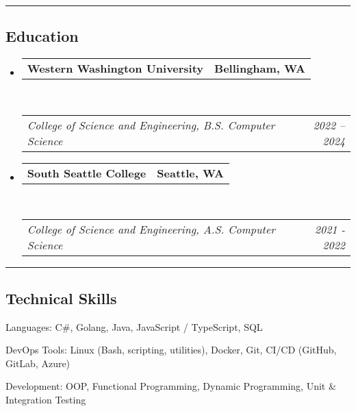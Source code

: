 \documentclass[10pt,letterpaper]{article}
\makeatletter
\newenvironment{indentsection}[1]%
{\begin{list}{}%
	{\setlength{\leftmargin}{#1}}%
	\item[]%
}
{\end{list}}
\newcommand{\headerrow}[2]
{\begin{tabular*}{\linewidth}{l@{\extracolsep{\fill}}r}
	#1 &
	#2 \\
\end{tabular*}}
\makeatother
\begin{document}
\hrule
\subsection*{Education}

\begin{itemize}
  \item
        \headerrow
        {\textbf{Western Washington University}}
        {\textbf{Bellingham, WA}}
        \\
        \headerrow
        {\emph{College of Science and Engineering, B.S. Computer Science}}
        {\emph{2022 -- 2024}}
  \item
        \headerrow
        {\textbf{South Seattle College}}
        {\textbf{Seattle, WA}}
        \\
        \headerrow
        {\emph{College of Science and Engineering, A.S. Computer Science}}
        {\emph{2021 - 2022}}
\end{itemize}

\hrule
\subsection*{Technical Skills}

\begin{indentsection}{\parindent}
  \begin{description*}
    \item[Languages:] C\#, Golang, Java, JavaScript / TypeScript, SQL
    \item[DevOps Tools:] Linux (Bash, scripting, utilities), Docker, Git, CI/CD (GitHub, GitLab, Azure)
    \item[Development:] OOP, Functional Programming, Dynamic Programming, Unit \& Integration Testing
  \end{description*}
\end{indentsection}
\end{document}
